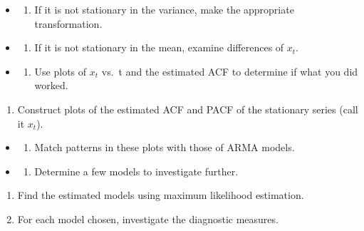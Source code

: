 \documentclass[
]{book}
\providecommand{\tightlist}{%
  \setlength{\itemsep}{0pt}\setlength{\parskip}{0pt}}
\theoremstyle{definition}
\theoremstyle{definition}
\theoremstyle{definition}
\theoremstyle{definition}
\theoremstyle{remark}
\begin{document}
\begin{itemize}
\item
  \begin{enumerate}
  \def\labelenumi{\alph{enumi}.}
  \tightlist
  \item
    If it is not stationary in the variance, make the appropriate transformation.
  \end{enumerate}
\item
  \begin{enumerate}
  \def\labelenumi{\alph{enumi}.}
  \setcounter{enumi}{1}
  \tightlist
  \item
    If it is not stationary in the mean, examine differences of \(x_t\).
  \end{enumerate}
\item
  \begin{enumerate}
  \def\labelenumi{\alph{enumi}.}
  \setcounter{enumi}{2}
  \tightlist
  \item
    Use plots of \(x_t\) vs.~t and the estimated ACF to determine if what you did worked.\\
  \end{enumerate}
\end{itemize}

\begin{enumerate}
\def\labelenumi{\arabic{enumi}.}
\setcounter{enumi}{1}
\tightlist
\item
  Construct plots of the estimated ACF and PACF of the stationary series (call it \(x_t\)).\\
\end{enumerate}

\begin{itemize}
\item
  \begin{enumerate}
  \def\labelenumi{\alph{enumi}.}
  \tightlist
  \item
    Match patterns in these plots with those of ARMA models.\\
  \end{enumerate}
\item
  \begin{enumerate}
  \def\labelenumi{\alph{enumi}.}
  \setcounter{enumi}{1}
  \tightlist
  \item
    Determine a few models to investigate further.\\
  \end{enumerate}
\end{itemize}

\begin{enumerate}
\def\labelenumi{\arabic{enumi}.}
\setcounter{enumi}{2}
\tightlist
\item
  Find the estimated models using maximum likelihood estimation.
\item
  For each model chosen, investigate the diagnostic measures.
\end{enumerate}
\end{document}
